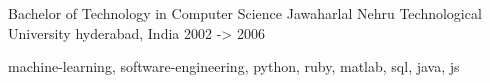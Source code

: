 \cventry
    {Bachelor of Technology in Computer Science} %
    {Jawaharlal Nehru Technological University} %
    {hyderabad, India} %
    {2002 -> 2006} %
    {
        \begin{cvitems} %
            \item {machine-learning, software-engineering, python, ruby, matlab, sql, java, js}
        \end{cvitems}
    }
